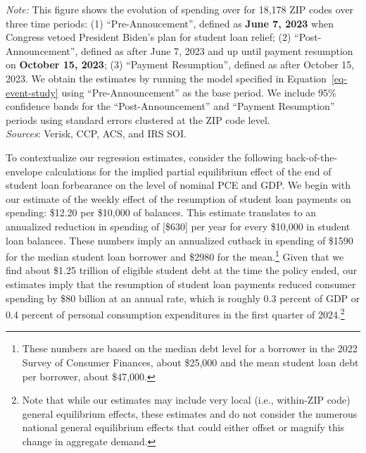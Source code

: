 \documentclass[
  letterpaper,
  DIV=11,
  numbers=noendperiod]{scrartcl}
\begin{document}
\emph{Note:} This figure shows the evolution of spending over for 18,178
ZIP codes over three time periods: (1) ``Pre-Annoucement'', defined as
\textbf{June 7, 2023} when Congress vetoed President Biden's plan for
student loan relief; (2) ``Post-Announcement'', defined as after June 7,
2023 and up until payment resumption on \textbf{October 15, 2023}; (3)
``Payment Resumption'', defined as after October 15, 2023. We obtain the
estimates by running the model specified in
Equation~\ref{eq-event-study} using ``Pre-Announcement'' as the base
period. We include 95\% confidence bands for the ``Post-Announcement''
and ``Payment Resumption'' periods using standard errors clustered at
the ZIP code level.\\
\emph{Sources}: Verisk, CCP, ACS, and IRS SOI.

To contextualize our regression estimates, consider the following
back-of-the-envelope calculations for the implied partial equilibrium
effect of the end of student loan forbearance on the level of nominal
PCE and GDP. We begin with our estimate of the weekly effect of the
resumption of student loan payments on spending: \$12.20 per \$10,000 of
balances. This estimate translates to an annualized reduction in
spending of {[}\$630{]} per year for every \$10,000 in student loan
balances. These numbers imply an annualized cutback in spending of
\$1590 for the median student loan borrower and \$2980 for the
mean.\footnote{These numbers are based on the median debt level for a
  borrower in the 2022 Survey of Consumer Finances, about \$25,000 and
  the mean student loan debt per borrower, about \$47,000.} Given that
we find about \$1.25 trillion of eligible student debt at the time the
policy ended, our estimates imply that the resumption of student loan
payments reduced consumer spending by \$80 billion at an annual rate,
which is roughly 0.3 percent of GDP or 0.4 percent of personal
consumption expenditures in the first quarter of 2024.\footnote{Note
  that while our estimates may include very local (i.e., within-ZIP
  code) general equilibrium effects, these estimates and do not consider
  the numerous national general equilibrium effects that could either
  offset or magnify this change in aggregate demand.}
\end{document}
